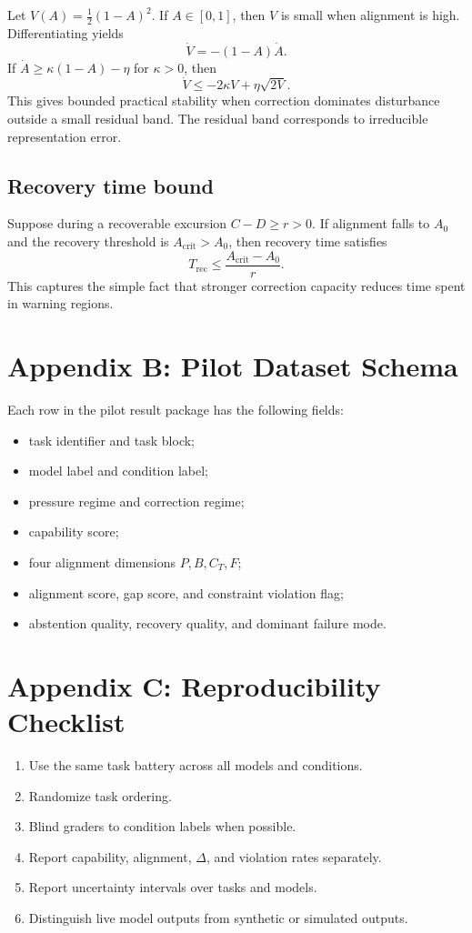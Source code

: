 \documentclass[11pt]{article}
\begin{document}
Let \(V(A)=\frac12(1-A)^2\). If \(A\in[0,1]\), then \(V\) is small when alignment is high. Differentiating yields
\[
\dot V = -(1-A)\dot A.
\]
If \(\dot A\ge \kappa(1-A)-\eta\) for \(\kappa>0\), then
\[
\dot V\le -2\kappa V + \eta\sqrt{2V}.
\]
This gives bounded practical stability when correction dominates disturbance outside a small residual band. The residual band corresponds to irreducible representation error.

\subsection{Recovery time bound}

Suppose during a recoverable excursion \(C-D\ge r>0\). If alignment falls to \(A_0\) and the recovery threshold is \(A_{\mathrm{crit}}>A_0\), then recovery time satisfies
\[
T_{\mathrm{rec}}\le \frac{A_{\mathrm{crit}}-A_0}{r}.
\]
This captures the simple fact that stronger correction capacity reduces time spent in warning regions.

\section{Appendix B: Pilot Dataset Schema}

Each row in the pilot result package has the following fields:
\begin{itemize}
    \item task identifier and task block;
    \item model label and condition label;
    \item pressure regime and correction regime;
    \item capability score;
    \item four alignment dimensions \(P,B,C_T,F\);
    \item alignment score, gap score, and constraint violation flag;
    \item abstention quality, recovery quality, and dominant failure mode.
\end{itemize}

\section{Appendix C: Reproducibility Checklist}

\begin{enumerate}
    \item Use the same task battery across all models and conditions.
    \item Randomize task ordering.
    \item Blind graders to condition labels when possible.
    \item Report capability, alignment, \(\Delta\), and violation rates separately.
    \item Report uncertainty intervals over tasks and models.
    \item Distinguish live model outputs from synthetic or simulated outputs.
\end{enumerate}
\end{document}
